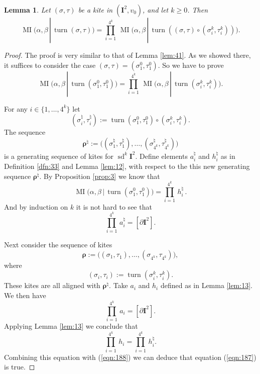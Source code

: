 \documentclass[10pt, a4paper]{amsart}
\newtheorem{lem}[equation]{Lemma}
\theoremstyle{definition}
\numberwithin{equation}{section}
\newcommand{\opn}{\operatorname}
\newcommand{\mbf}[1]{\mathbf{#1}}
\newcommand{\bsym}[1]{\boldsymbol{#1}}
\renewcommand{\vert}{\, | \,}
\begin{document}
\begin{lem} \label{lem:42}
Let $(\sigma, \tau)$ be a kite in $(\mbf{I}^2, v_0)$, and let $k \geq 0$. Then 
\begin{equation*} \label{eqn:186}
\opn{MI} \bigl( \alpha, \beta \vert \opn{turn}(\sigma, \tau) \bigr) = 
\prod_{i = 1}^{4^k} \, 
\opn{MI} \bigl( \alpha, \beta \vert \opn{turn}( (\sigma, \tau) \circ 
(\sigma^k_i, \tau^k_i) ) \bigr) .
\end{equation*}
\end{lem}

\begin{proof}
The proof is very similar to that of Lemma \ref{lem:41}. As we showed there, it 
suffices to consider the case
$(\sigma, \tau) = (\sigma^0_1, \tau^0_1)$.
So we have to prove
\begin{equation} \label{eqn:187} 
\opn{MI} \bigl( \alpha, \beta \vert \opn{turn}(\sigma^0_1, \tau^0_1) \bigr) = 
\prod_{i = 1}^{4^k} \, 
\opn{MI} \bigl( \alpha, \beta \vert \opn{turn}(\sigma^k_i, \tau^k_i) \bigr) .
\end{equation}

For any $i \in \{ 1, \ldots, 4^k \}$ let
\[ (\sigma^{\natural}_i, \tau^{\natural}_i) :=
\opn{turn}(\sigma^0_1, \tau^0_1) \circ  (\sigma^k_i, \tau^k_i) . \]
The sequence
\[ \bsym{\rho}^{\natural} := \bigl( (\sigma^{\natural}_1, \tau^{\natural}_1),
\ldots, (\sigma^{\natural}_{4^k}, \tau^{\natural}_{4^k}) \bigr) \]
is a generating sequence of kites for $\opn{sd}^k \mbf{I}^2$.
Define elements $a^{\natural}_i$ and $h^{\natural}_i$ as 
in Definition \ref{dfn:33} and Lemma \ref{lem:12}, with respect to
the this new generating sequence $\bsym{\rho}^{\natural}$. 
By Proposition \ref{prop:3} we know that
\begin{equation} \label{eqn:188} 
\opn{MI} \bigl( \alpha, \beta \vert \opn{turn}(\sigma^0_1, \tau^0_1) \bigr) = 
\prod_{i = 1}^{4^k} \, h^{\natural}_i  \, .
\end{equation}
And by induction on $k$ it is not hard to see that 
\begin{equation} \label{eqn:189} 
\prod_{i = 1}^{4^k} \, a^{\natural}_i  = [ \partial \mbf{I}^2 ] . 
\end{equation}

Next consider the sequence of kites
\[ \bsym{\rho} := \bigl( (\sigma_1, \tau^{}_1),
\ldots, (\sigma^{}_{4^k}, \tau^{}_{4^k}) \bigr) , \]
where
\[ (\sigma_i, \tau_i) := \opn{turn}(\sigma^k_i, \tau^k_i) . \]
These kites are all aligned with $\bsym{\rho}^{\natural}$.
Take $a_i$ and $h_i$ defined as in Lemma \ref{lem:13}. We then have
\[ \prod_{i = 1}^{4^k} \, a_i = [ \partial \mbf{I}^2 ] . \]
Applying Lemma \ref{lem:13} we conclude that 
\[ \prod_{i = 1}^{4^k} \, h_i = \prod_{i = 1}^{4^k} \, h^{\natural}_i . \]
Combining this equation with (\ref{eqn:188})
we can deduce that equation (\ref{eqn:187}) is true.
\end{proof}
\end{document}
